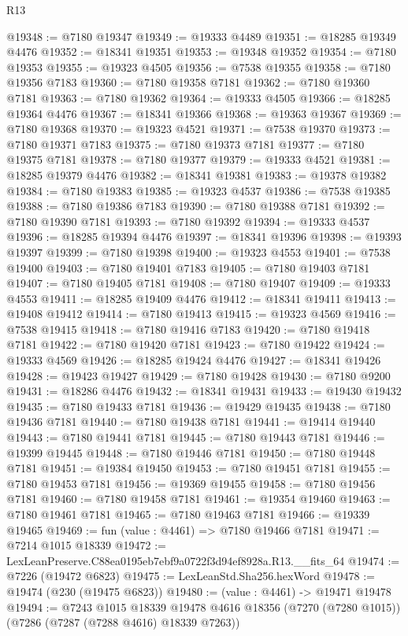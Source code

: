 \begin{lexlean}{R13}
\begin{coremodule}
@19348 := @7180 @19347
@19349 := @19333 @4489
@19351 := @18285 @19349 @4476
@19352 := @18341 @19351
@19353 := @19348 @19352
@19354 := @7180 @19353
@19355 := @19323 @4505
@19356 := @7538 @19355
@19358 := @7180 @19356 @7183
@19360 := @7180 @19358 @7181
@19362 := @7180 @19360 @7181
@19363 := @7180 @19362
@19364 := @19333 @4505
@19366 := @18285 @19364 @4476
@19367 := @18341 @19366
@19368 := @19363 @19367
@19369 := @7180 @19368
@19370 := @19323 @4521
@19371 := @7538 @19370
@19373 := @7180 @19371 @7183
@19375 := @7180 @19373 @7181
@19377 := @7180 @19375 @7181
@19378 := @7180 @19377
@19379 := @19333 @4521
@19381 := @18285 @19379 @4476
@19382 := @18341 @19381
@19383 := @19378 @19382
@19384 := @7180 @19383
@19385 := @19323 @4537
@19386 := @7538 @19385
@19388 := @7180 @19386 @7183
@19390 := @7180 @19388 @7181
@19392 := @7180 @19390 @7181
@19393 := @7180 @19392
@19394 := @19333 @4537
@19396 := @18285 @19394 @4476
@19397 := @18341 @19396
@19398 := @19393 @19397
@19399 := @7180 @19398
@19400 := @19323 @4553
@19401 := @7538 @19400
@19403 := @7180 @19401 @7183
@19405 := @7180 @19403 @7181
@19407 := @7180 @19405 @7181
@19408 := @7180 @19407
@19409 := @19333 @4553
@19411 := @18285 @19409 @4476
@19412 := @18341 @19411
@19413 := @19408 @19412
@19414 := @7180 @19413
@19415 := @19323 @4569
@19416 := @7538 @19415
@19418 := @7180 @19416 @7183
@19420 := @7180 @19418 @7181
@19422 := @7180 @19420 @7181
@19423 := @7180 @19422
@19424 := @19333 @4569
@19426 := @18285 @19424 @4476
@19427 := @18341 @19426
@19428 := @19423 @19427
@19429 := @7180 @19428
@19430 := @7180 @9200
@19431 := @18286 @4476
@19432 := @18341 @19431
@19433 := @19430 @19432
@19435 := @7180 @19433 @7181
@19436 := @19429 @19435
@19438 := @7180 @19436 @7181
@19440 := @7180 @19438 @7181
@19441 := @19414 @19440
@19443 := @7180 @19441 @7181
@19445 := @7180 @19443 @7181
@19446 := @19399 @19445
@19448 := @7180 @19446 @7181
@19450 := @7180 @19448 @7181
@19451 := @19384 @19450
@19453 := @7180 @19451 @7181
@19455 := @7180 @19453 @7181
@19456 := @19369 @19455
@19458 := @7180 @19456 @7181
@19460 := @7180 @19458 @7181
@19461 := @19354 @19460
@19463 := @7180 @19461 @7181
@19465 := @7180 @19463 @7181
@19466 := @19339 @19465
@19469 := fun (value : @4461) => @7180 @19466 @7181
@19471 := @7214 @1015 @18339
@19472 := LexLeanPreserve.C88ea0195eb7ebf9a0722f3d94ef8928a.R13.__fits_64
@19474 := @7226 (@19472 @6823)
@19475 := LexLeanStd.Sha256.hexWord
@19478 := @19474 (@230 (@19475 @6823))
@19480 := (value : @4461) -> @19471 @19478
@19494 := @7243
    @1015
    @18339
    @19478
    @4616
    @18356
    (@7270 (@7280 @1015))
    (@7286 (@7287 (@7288 @4616) @18339 @7263))

\end{coremodule}
\end{lexlean}
